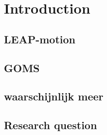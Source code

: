 \section{Introduction}

\subsection{LEAP-motion}
\subsection{GOMS}
\subsection{waarschijnlijk meer}
\subsection{Research question}